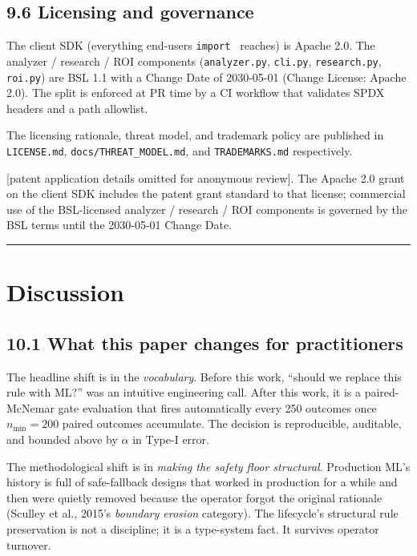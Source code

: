 \subsection{9.6 Licensing and
governance}\label{licensing-and-governance}

The client SDK (everything end-users \texttt{import\ \pkgname{}} reaches)
is Apache 2.0. The analyzer / research / ROI components
(\texttt{analyzer.py}, \texttt{cli.py}, \texttt{research.py},
\texttt{roi.py}) are BSL 1.1 with a Change Date of 2030-05-01 (Change
License: Apache 2.0). The split is enforced at PR time by a CI workflow
that validates SPDX headers and a path allowlist.

The licensing rationale, threat model, and trademark policy are
published in \texttt{LICENSE.md}, \texttt{docs/THREAT\_MODEL.md}, and
\texttt{TRADEMARKS.md} respectively.

{[}patent application details omitted for anonymous review{]}. The
Apache 2.0 grant on the client SDK includes the patent grant standard to
that license; commercial use of the BSL-licensed analyzer / research /
ROI components is governed by the BSL terms until the 2030-05-01 Change
Date.

\begin{center}\rule{0.5\linewidth}{0.5pt}\end{center}

\section{Discussion}\label{discussion}

\subsection{10.1 What this paper changes for
practitioners}\label{what-this-paper-changes-for-practitioners}

The headline shift is in the \emph{vocabulary}. Before this work,
``should we replace this rule with ML?'' was an intuitive engineering
call. After this work, it is a paired-McNemar gate evaluation that fires
automatically every 250 outcomes once \(n_{\min} = 200\) paired outcomes
accumulate. The decision is reproducible, auditable, and bounded above
by \(\alpha\) in Type-I error.

The methodological shift is in \emph{making the safety floor
structural}. Production ML's history is full of safe-fallback designs
that worked in production for a while and then were quietly removed
because the operator forgot the original rationale (Sculley et al.,
2015's \emph{boundary erosion} category). The lifecycle's structural
rule preservation is not a discipline; it is a type-system fact. It
survives operator turnover.

